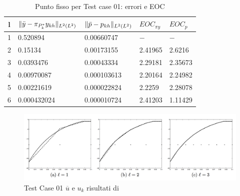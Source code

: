 \begin{table}
\caption{Punto fisso per Test case 01: errori e EOC }
\label{puntofissoIbis}
\centering

\begin{tabular}{cllll}
\toprule
{l}           &  {$ \lVert\bar{y}-\pi_{P^*_k}y_{kh}\rVert_{L^2(L^2)} $} &  {$ \lVert\bar{p}-p_{kh}\rVert_{L^2(L^2)} $} &  {$ EOC_{\pi y} $} &  {$ EOC_p $} \\
\midrule
1            &  0.520894 &  0.00660747 &  {$-$} &  {$-$} \\
2            &  0.15134 &  0.00173155 &  2.41965 &  2.6216 \\
3            &  0.0393476 &  0.00043334 &  2.29181 &  2.35673 \\
4            &  0.00970087 &  0.000103613 &  2.20164 &  2.24982 \\
5            &  0.00221619 &  0.000022824 &  2.2259 &  2.28078 \\
6            &  0.000432024 &  0.000010724 &  2.41203 &  1.11429 \\
\bottomrule
\end{tabular}              

\end{table}
\begin{figure}
\centering
\includegraphics[width=\linewidth]{img/cap6/TestCase01_ues_paper}
\caption{Test Case 01 $\overline{u}$ e $u_k$ risultati di \cite{MAIN}}
\label{fig:500}
\end{figure}

